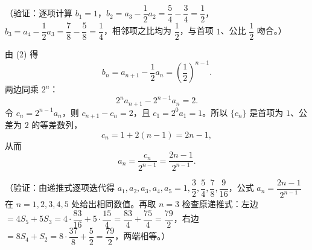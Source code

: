 \begin{answer}
（验证：逐项计算 \(b_1=1\)，\(b_2=a_3-\dfrac12a_2=\dfrac54-\dfrac34=\dfrac12\)，\(b_3=a_4-\dfrac12a_3=\dfrac78-\dfrac58=\dfrac14\)，相邻项之比均为 \(\dfrac12\)，与首项 \(1\)、公比 \(\dfrac12\) 吻合。）


由 (2) 得
\nopagebreak[4]
\[
b_n=a_{n+1}-\dfrac12a_n=\left(\dfrac12\right)^{n-1}.
\]
两边同乘 \(2^n\)：
\nopagebreak[4]
\[
2^na_{n+1}-2^{n-1}a_n=2.
\]
令 \(c_n=2^{n-1}a_n\)，则 \(c_{n+1}-c_n=2\)，且 \(c_1=2^0a_1=1\)。所以 \(\{c_n\}\) 是首项为 \(1\)、公差为 \(2\) 的等差数列，
\nopagebreak[4]
\[
c_n=1+2(n-1)=2n-1,
\]
从而
\nopagebreak[4]
\[
a_n=\dfrac{c_n}{2^{n-1}}=\dfrac{2n-1}{2^{n-1}}.
\]

（验证：由递推式逐项迭代得 \(a_1,a_2,a_3,a_4,a_5=1,\dfrac32,\dfrac54,\dfrac78,\dfrac9{16}\)，公式 \(a_n=\dfrac{2n-1}{2^{n-1}}\) 在 \(n=1,2,3,4,5\) 处给出相同数值。再取 \(n=3\) 检查原递推式：左边 \(=4S_5+5S_3=4\cdot\dfrac{83}{16}+5\cdot\dfrac{15}{4}=\dfrac{83}{4}+\dfrac{75}{4}=\dfrac{79}{2}\)，右边 \(=8S_4+S_2=8\cdot\dfrac{37}{8}+\dfrac52=\dfrac{79}{2}\)，两端相等。）




\end{answer}
